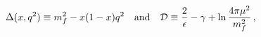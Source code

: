 \begin{equation}
\Delta(x,q^2) \equiv m_f^2 - x(1-x)q^2 \quad {\rm and}\quad
{\mathcal D} \equiv \frac{2}{\epsilon} - \gamma + \ln 
\frac{4\pi\mu^2}{m_f^2} \, ,
\end{equation}

